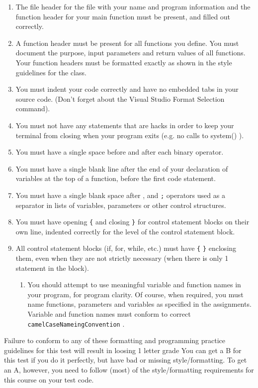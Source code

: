 \documentclass[11pt]{article}
\begin{document}
\begin{enumerate}
\item The file header for the file with your name and program information
and the function header for your main function must be present, and
filled out correctly.
\item A function header must be present for all functions you define.
You must document the purpose, input parameters and return values
of all functions.  Your function headers must be formatted exactly
as shown in the style guidelines for the class.
\item You must indent your code correctly and have no embedded tabs in
your source code. (Don't forget about the Visual Studio Format
Selection command).
\item You must not have any statements that are hacks in order to keep
your terminal from closing when your program exits (e.g. no calls
to system() ).
\item You must have a single space before and after each binary operator.
\item You must have a single blank line after the end of your declaration
of variables at the top of a function, before the first code
statement.
\item You must have a single blank space after , and \verb~;~ operators used as a
separator in lists of variables, parameters or other control
structures.
\item You must have opening \verb~{~ and closing \verb~}~ for control statement blocks
on their own line, indented correctly for the level of the control
statement block.
\item All control statement blocks (if, for, while, etc.) must have \verb~{~
\verb~}~ enclosing them, even when they are not strictly necessary
(when there is only 1 statement in the block).
\begin{enumerate}
\item You should attempt to use meaningful variable and function names in
your program, for program clarity.  Of course, when required, you
must name functions, parameters and variables as specified in the
assignments.  Variable and function names must conform to correct
\verb~camelCaseNameingConvention~ .
\end{enumerate}
\end{enumerate}

Failure to conform to any of these formatting and programming practice
guidelines for this test will result in loosing 1 letter grade You can
get a B for this test if you do it perfectly, but have bad or missing
style/formatting.  To get an A, however, you need to follow (most) of
the style/formatting requirements for this course on your test code.
\end{document}
